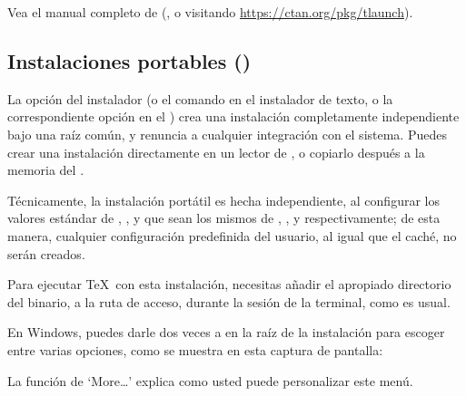 \documentclass{article}
\begin{document}
Vea el manual completo de  (, o visitando \url{https://ctan.org/pkg/tlaunch}).

\subsection{Instalaciones portables (\USB{})}
\label{sec:portable-tl}

La opción  del instalador (o el comando
 en el instalador de texto, o la correspondiente
opción en el \GUI{}) crea una instalación completamente
independiente bajo una raíz común, y renuncia a cualquier
integración con el sistema. Puedes crear una instalación
directamente en un lector de \USB{}, o copiarlo después a la
memoria del \USB{}.

Técnicamente, la instalación portátil es hecha independiente, al configurar los valores estándar de , , y
 que sean los mismos de ,
, y  respectivamente; de esta manera, cualquier configuración predefinida del usuario, al igual que el caché, no serán creados. 
 
Para ejecutar \TeX\ con esta instalación, necesitas añadir el
apropiado directorio del binario, a la ruta de acceso, durante la sesión
de la terminal, como es usual.

En Windows, puedes darle dos veces a 
 en la raíz de la instalación para escoger
entre varias opciones, como se muestra en esta captura de pantalla:

\medskip
{}
\smallskip

\noindent La función de `More\ldots' explica como usted puede
personalizar este menú. 
\end{document}
